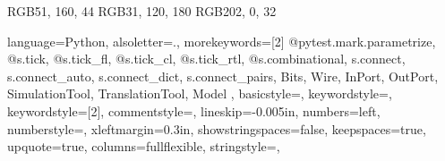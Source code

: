 
\definecolor{dmlgreen}    {RGB}{51,  160,  44}
\definecolor{dmlblue}     {RGB}{31,  120, 180}
\definecolor{dmlred}      {RGB}{202,   0,  32}


\lstset
{%
  language=Python,%
  alsoletter={.},
  morekeywords=[2]{
    @pytest.mark.parametrize,
    @s.tick,
    @s.tick_fl,
    @s.tick_cl,
    @s.tick_rtl,
    @s.combinational,
    s.connect,
    s.connect_auto,
    s.connect_dict,
    s.connect_pairs,
    Bits,
    Wire,
    InPort,
    OutPort,
    SimulationTool,
    TranslationTool,
    Model
  },
  basicstyle={\ttfamily\footnotesize},%
  keywordstyle={\color{cbxgreenC}},%
  keywordstyle={[2]\color{cbxblueC}},%
  commentstyle={\color{cbxredC}},
  lineskip={-0.005in},%
  numbers={left},%
  numberstyle={\tiny},%
  xleftmargin={0.3in},%
  showstringspaces={false},%
  keepspaces={true},%
  upquote={true},%
  columns={fullflexible},%
  stringstyle={\color{brown}},%
}%

